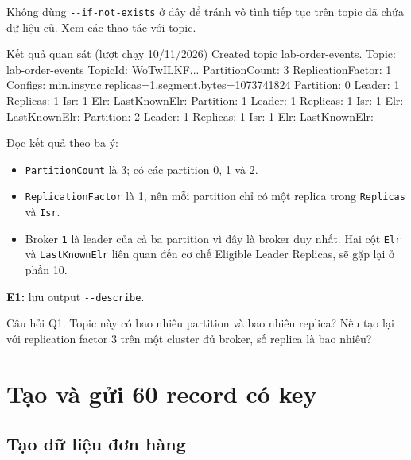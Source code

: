 Không dùng \texttt{-\allowbreak{}-\allowbreak{}if-\allowbreak{}not-\allowbreak{}exists} ở đây để tránh vô tình tiếp tục trên topic đã chứa dữ liệu cũ. Xem \href{https://kafka.apache.org/41/operations/basic-kafka-operations/}{các thao tác với topic}.


\begin{aivnCodeOutput}{Kết quả quan sát (lượt chạy 10/11/2026)}
Created topic lab-order-events.
Topic: lab-order-events  TopicId: WoTwILKF...  PartitionCount: 3  ReplicationFactor: 1
  Configs: min.insync.replicas=1,segment.bytes=1073741824
  Partition: 0  Leader: 1  Replicas: 1  Isr: 1  Elr:   LastKnownElr:
  Partition: 1  Leader: 1  Replicas: 1  Isr: 1  Elr:   LastKnownElr:
  Partition: 2  Leader: 1  Replicas: 1  Isr: 1  Elr:   LastKnownElr:
\end{aivnCodeOutput}

Đọc kết quả theo ba ý:


\begin{itemize}
\item \texttt{PartitionCount} là 3; có các partition 0, 1 và 2.
\item \texttt{ReplicationFactor} là 1, nên mỗi partition chỉ có một replica trong \texttt{Replicas} và \texttt{Isr}.
\item Broker \texttt{1} là leader của cả ba partition vì đây là broker duy nhất. Hai cột \texttt{Elr} và \texttt{LastKnownElr} liên quan đến cơ chế Eligible Leader Replicas, sẽ gặp lại ở phần 10.
\end{itemize}

\begin{evidencebox}
\textbf{E1:} lưu output \texttt{-\allowbreak{}-\allowbreak{}describe}.
\end{evidencebox}

\begin{questionbox}{Câu hỏi Q1.}
Topic này có bao nhiêu partition và bao nhiêu replica? Nếu tạo lại với replication factor 3 trên một cluster đủ broker, số replica là bao nhiêu?
\end{questionbox}

\section{Tạo và gửi 60 record có key}

\subsection{Tạo dữ liệu đơn hàng}

